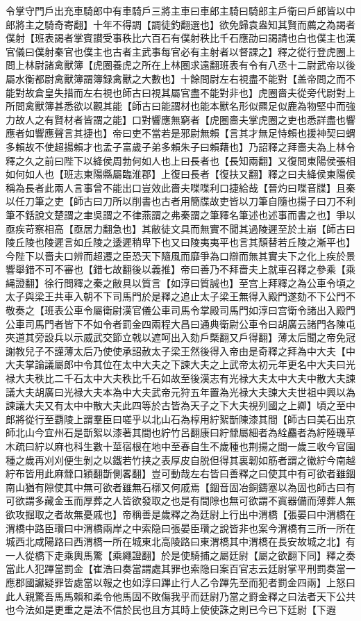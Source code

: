 令掌守門戶出充車騎郎中有車騎戶三將主車曰車郎主騎曰騎郎主戶衛曰戶郎皆以中郎將主之騎奇寄翻】十年不得調【調徒釣翻選也】欲免歸袁盎知其賢而薦之為謁者僕射【班表謁者掌賓讃受事秩比六百石有僕射秩比千石應劭曰謁請也白也僕主也漢官儀曰僕射秦官也僕主也古者主武事每官必有主射者以督課之】釋之從行登虎圈上問上林尉諸禽獸簿【虎圈養虎之所在上林圈求遠翻班表有令有八丞十二尉武帝以後屬水衡都尉禽獸簿謂簿録禽獸之大數也】十餘問尉左右視盡不能對【盖帝問之而不能對故倉皇失措而左右視也師古曰視其屬官盡不能對非也】虎圈嗇夫從旁代尉對上所問禽獸簿甚悉欲以觀其能【師古曰能謂材也能本獸名形似羆足似鹿為物堅中而強力故人之有賢材者皆謂之能】口對響應無窮者【虎圈嗇夫掌虎圈之吏也悉詳盡也響應者如響應聲言其捷也】帝曰吏不當若是邪尉無賴【言其才無足恃賴也援神契曰蝟多賴故不使超揚賴才也孟子富歲子弟多賴朱子曰賴藉也】乃詔釋之拜嗇夫為上林令釋之久之前曰陛下以絳侯周勃何如人也上曰長者也【長知兩翻】又復問東陽侯張相如何如人也【班志東陽縣屬臨淮郡】上復曰長者【復扶又翻】釋之曰夫絳侯東陽侯稱為長者此兩人言事曾不能出口豈效此嗇夫喋喋利口捷給哉【晉灼曰喋音牒】且秦以任刀筆之吏【師古曰刀所以削書也古者用簡牒故吏皆以刀筆自隨也揚子曰刀不利筆不銛說文楚謂之聿吳謂之不律燕謂之弗秦謂之筆釋名筆述也述事而書之也】爭以亟疾苛察相高【亟居力翻急也】其敝徒文具而無實不聞其過陵遲至於土崩【師古曰陵丘陵也陵遲言如丘陵之逶遲稍卑下也又曰陵夷夷平也言其頹替若丘陵之漸平也】今陛下以嗇夫口辨而超遷之臣恐天下隨風而靡爭為口辯而無其實夫下之化上疾於景響舉錯不可不審也【錯七故翻後以義推】帝曰善乃不拜嗇夫上就車召釋之參乘【乘䋲證翻】徐行問釋之秦之敝具以質言【如淳曰質誠也】至宫上拜釋之為公車令頃之太子與梁王共車入朝不下司馬門於是釋之追止太子梁王無得入殿門遂劾不下公門不敬奏之【班表公車令屬衛尉漢官儀公車司馬令掌殿司馬門如淳曰宫衛令諸出入殿門公車司馬門者皆下不如令者罰金四兩程大昌曰通典衛尉公車令曰胡廣云諸門各陳屯夾道其旁設兵以示威武交節立戟以遮呵出入劾戶槩翻又戶得翻】薄太后聞之帝免冠謝教兒子不謹薄太后乃使使承詔赦太子梁王然後得入帝由是奇釋之拜為中大夫【中大夫掌論議屬郎中令其位在太中大夫之下諫大夫之上武帝太初元年更名中大夫曰光禄大夫秩比二千石太中大夫秩比千石如故至後漢志有光禄大夫太中大夫中散大夫諫議大夫胡廣曰光禄大夫本為中大夫武帝元狩五年置為光禄大夫諫大夫世祖中興以為諫議大夫又有太中中散大夫此四等於古皆為天子之下大夫視列國之上卿】頃之至中郎將從行至覇陵上謂羣臣曰嗟乎以北山石為椁用紵絮斮陳漆其間【師古曰美石出京師北山今宜州石是斮絮以漆著其間也紵竹呂翻康曰紵檾屬細者為絟麤者為紵陸璣草木疏曰紵以麻也科生數十莖宿根在地中至春自生不歲種也荆揚之間一歲三收今官園種之歲再刈刈便生剝之以鐵若竹挟之表厚皮自脱但得其裏韌如筋者謂之徽紵今南越紵布皆用此麻檾口穎翻斮側畧翻】豈可動哉左右皆曰善釋之曰使其中有可欲者雖錮南山猶有隙使其中無可欲者雖無石槨又何戚焉【錮音固冶銅鑄塞以為固也師古曰有可欲謂多藏金玉而厚葬之人皆欲發取之也是有間隙也無可欲謂不寘器備而薄葬人無欲攻掘取之者故無憂戚也】帝稱善是歲釋之為廷尉上行出中渭橋【張晏曰中渭橋在渭橋中路臣瓚曰中渭橋兩岸之中索隐曰張晏臣瓚之說皆非也案今渭橋有三所一所在城西北咸陽路曰西渭橋一所在城東北高陵路曰東渭橋其中渭橋在長安故城之北】有一人從橋下走乘輿馬驚【乘繩證翻】於是使騎捕之屬廷尉【屬之欲翻下同】釋之奏當此人犯蹕當罰金【崔浩曰奏當謂處其罪也索隐曰案百官志云廷尉掌平刑罰奏當一應郡國讞疑罪皆處當以報之也如淳曰蹕止行人乙令蹕先至而犯者罰金四兩】上怒曰此人親驚吾馬馬賴和柔令他馬固不敗傷我乎而廷尉乃當之罸金釋之曰法者天下公共也今法如是更重之是法不信於民也且方其時上使使誅之則已今已下廷尉【下遐